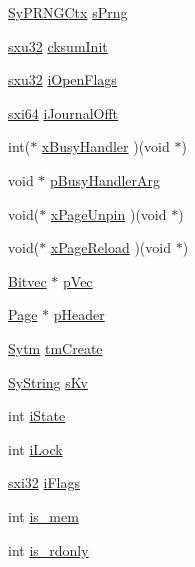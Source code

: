 \begin{DoxyCompactItemize}
\item 
\hyperlink{struct_sy_p_r_n_g_ctx}{Sy\-P\-R\-N\-G\-Ctx} \hyperlink{struct_pager_af69de6e8a1c6d1da3aa8e35ff318d2e4}{s\-Prng}
\item 
\hyperlink{unqlite_8c_abc5a8a3f345c200c98c485551f49666e}{sxu32} \hyperlink{struct_pager_a93551028ee3c8953904e8db1afe96353}{cksum\-Init}
\item 
\hyperlink{unqlite_8c_abc5a8a3f345c200c98c485551f49666e}{sxu32} \hyperlink{struct_pager_a96081dcf87a2e0cb55744d63a2003f2b}{i\-Open\-Flags}
\item 
\hyperlink{unqlite_8c_a7913a13763a99412223d5dfa1829dd73}{sxi64} \hyperlink{struct_pager_a6959bfce1c0e8584a3da72aadfe3fda0}{i\-Journal\-Offt}
\item 
int($\ast$ \hyperlink{struct_pager_ac8477f7cc39fefd81b4089994e13d215}{x\-Busy\-Handler} )(void $\ast$)
\item 
void $\ast$ \hyperlink{struct_pager_a7a685e7a8dcbcd725c5a982fd8deb91b}{p\-Busy\-Handler\-Arg}
\item 
void($\ast$ \hyperlink{struct_pager_a75505ba2bbaf30149b3f89249ace67da}{x\-Page\-Unpin} )(void $\ast$)
\item 
void($\ast$ \hyperlink{struct_pager_a676b479fb5c291437969a43eb9d4cd26}{x\-Page\-Reload} )(void $\ast$)
\item 
\hyperlink{struct_bitvec}{Bitvec} $\ast$ \hyperlink{struct_pager_a85f3b7fa45bee88bf4474a35310a1279}{p\-Vec}
\item 
\hyperlink{struct_page}{Page} $\ast$ \hyperlink{struct_pager_aa632dbff3bf006017c962edabf109538}{p\-Header}
\item 
\hyperlink{struct_sytm}{Sytm} \hyperlink{struct_pager_aad7cbb1e91e9077a82a11055277d16e8}{tm\-Create}
\item 
\hyperlink{struct_sy_string}{Sy\-String} \hyperlink{struct_pager_a9d8d1fa503376402067ae46fcf5a0d2a}{s\-Kv}
\item 
int \hyperlink{struct_pager_aa3926eb42860541dfdfaaca86a62669d}{i\-State}
\item 
int \hyperlink{struct_pager_a0c9e58c295cf23cbe441f188bcebcdf1}{i\-Lock}
\item 
\hyperlink{unqlite_8c_a5a58035d4ae379178e2ca46cc3272fc5}{sxi32} \hyperlink{struct_pager_adc5960ec4b8bfa261a56b4b10fac8284}{i\-Flags}
\item 
int \hyperlink{struct_pager_aa053696be115ce6ada396774b5844a97}{is\-\_\-mem}
\item 
int \hyperlink{struct_pager_a01a93712af0c76baea44fce816347f52}{is\-\_\-rdonly}
\item 

\end{DoxyCompactItemize}
